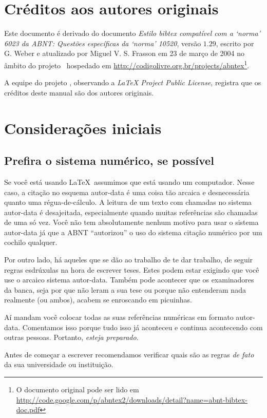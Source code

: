 \documentclass[a4paper]{ltxdoc}
\begin{document}
\section{Créditos aos autores originais}

Este documento é derivado do documento \emph{Estilo bibtex compatível com a
`norma' 6023 da ABNT: Questões específicas da `norma' 10520}, versão $ 1.29
$, escrito por G. Weber e atualizado por Miguel V. S. Frasson em 23 de março de
2004 no âmbito do projeto \abnTeX\ hospedado em
\url{http://codigolivre.org.br/projects/abntex}\footnote{O documento original pode ser lido em
\url{http://code.google.com/p/abntex2/downloads/detail?name=abnt-bibtex-doc.pdf}}.

A equipe do projeto , observando a \emph{LaTeX Project Public License},
registra que os créditos deste manual são dos autores originais.


\section{Considerações iniciais}

\subsection{Prefira o sistema numérico, se possível}

Se você está usando \LaTeX\, assumimos que está usando um computador. Nesse
caso, a citação no esquema autor-data é uma coisa tão arcaica e desnecessária
quanto uma régua-de-cálculo. A leitura de um texto com chamadas no sistema
autor-data é desajeitada, especialmente quando muitas referências são chamadas
de uma só vez. Você não tem absolutamente nenhum motivo para usar o sistema
autor-data já que a ABNT ``autorizou'' o uso do sistema citação numérico
por um cochilo qualquer.

Por outro lado, há aqueles que se dão ao trabalho de te dar trabalho, de seguir
regras esdrúxulas na hora de escrever teses. Estes podem estar exigindo que você
use o arcaico sistema autor-data. Também pode acontecer que os examinadores da
banca, seja por que não leram a sua tese ou porque não entenderam nada
realmente (ou ambos), acabem se enroscando em picuinhas.

Aí mandam você colocar todas as suas referências numéricas em formato
autor-data. Comentamos isso porque tudo isso já aconteceu e continua acontecendo 
com outras pessoas. Portanto, \emph{esteja preparado}. 

Antes de começar a escrever recomendamos verificar quais são as regras \emph{de
fato} da sua universidade ou instituição.
\end{document}
